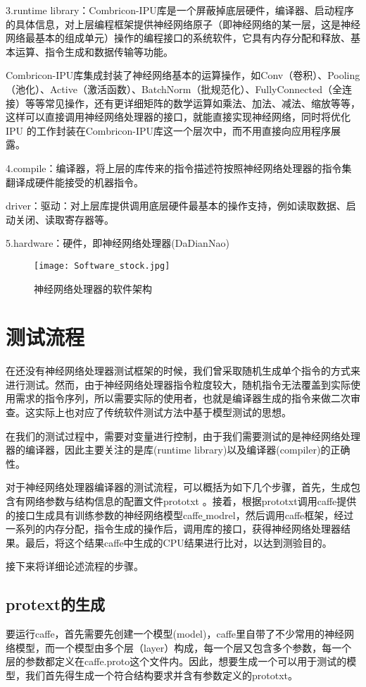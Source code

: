 3.runtime library：Combricon-IPU库是一个屏蔽掉底层硬件，编译器、启动程序的具体信息，对上层编程框架提供神经网络原子（即神经网络的某一层，这是神经网络最基本的组成单元）操作的编程接口的系统软件，它具有内存分配和释放、基本运算、指令生成和数据传输等功能。

Combricon-IPU库集成封装了神经网络基本的运算操作，如Conv（卷积）、Pooling（池化）、Active（激活函数）、BatchNorm（批规范化）、FullyConnected（全连接）等等常见操作，还有更详细矩阵的数学运算如乘法、加法、减法、缩放等等，这样可以直接调用神经网络处理器的接口，就能直接实现神经网络，同时将优化IPU 的工作封装在Combricon-IPU库这一个层次中，而不用直接向应用程序展露。

4.compile：编译器，将上层的库传来的指令描述符按照神经网络处理器的指令集翻译成硬件能接受的机器指令。

driver：驱动：对上层库提供调用底层硬件最基本的操作支持，例如读取数据、启动关闭、读取寄存器等。

5.hardware：硬件，即神经网络处理器(DaDianNao)

\begin{figure}[!htbp]
\centering
\texttt{[image: Software\_stock.jpg]}
\caption{神经网络处理器的软件架构}
\label{fig:Software stock}
\end{figure}

\section{测试流程}
在还没有神经网络处理器测试框架的时候，我们曾采取随机生成单个指令的方式来进行测试。然而，由于神经网络处理器指令粒度较大，随机指令无法覆盖到实际使用需求的指令序列，所以需要实际的使用者，也就是编译器生成的指令来做二次审查。这实际上也对应了传统软件测试方法中基于模型测试的思想。

在我们的测试过程中，需要对变量进行控制，由于我们需要测试的是神经网络处理器的编译器，因此主要关注的是库(runtime library)以及编译器(compiler)的正确性。

对于神经网络处理器编译器的测试流程，可以概括为如下几个步骤，首先，生成包含有网络参数与结构信息的配置文件prototxt 。接着，根据prototxt调用caffe提供的接口生成具有训练参数的神经网络模型caffe\underline{ }modrel，然后调用caffe框架，经过一系列的内存分配，指令生成的操作后，调用库的接口，获得神经网络处理器结果。最后，将这个结果caffe中生成的CPU结果进行比对，以达到测验目的。

接下来将详细论述流程的步骤。
\subsection{protext的生成}
要运行caffe，首先需要先创建一个模型(model)，caffe里自带了不少常用的神经网络模型，而一个模型由多个层（layer）构成，每一个层又包含多个参数，每一个层的参数都定义在caffe.proto这个文件内。因此，想要生成一个可以用于测试的模型，我们首先得生成一个符合结构要求并含有参数定义的prototxt。

